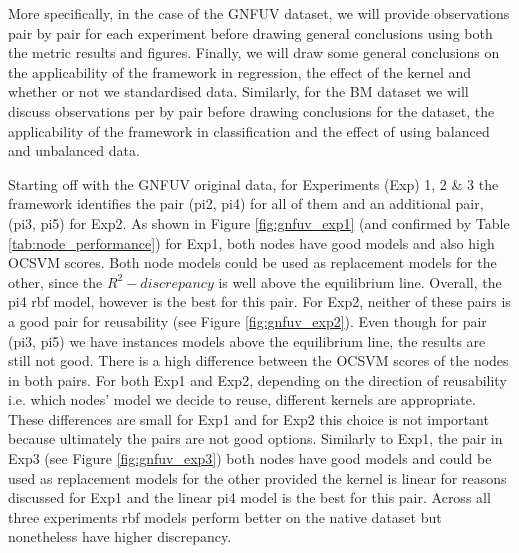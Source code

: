 \documentclass{mpaper}
\begin{document}
More specifically, in the case of the GNFUV dataset, we will provide observations pair by pair for each experiment before drawing general conclusions using both the metric results and figures. Finally, we will draw some general conclusions on the applicability of the framework in regression, the effect of the kernel and whether or not we standardised data. Similarly, for the BM dataset we will discuss observations per by pair before drawing conclusions for the dataset, the applicability of the framework in classification and the effect of using balanced and unbalanced data.

Starting off with the GNFUV original data, for Experiments (Exp) 1, 2 \& 3 the framework identifies the pair (pi2, pi4) for all of them and an additional pair, (pi3, pi5) for Exp2. As shown in Figure \ref{fig:gnfuv_exp1} (and confirmed by Table \ref{tab:node_performance}) for Exp1, both nodes have good models and also high OCSVM scores. Both node models could be used as replacement models for the other, since the $R^2 - discrepancy$ is well above the equilibrium line. Overall, the pi4 rbf model, however is the best for this pair. For Exp2, neither of these pairs is a good pair for reusability (see Figure \ref{fig:gnfuv_exp2}). Even though for pair (pi3, pi5) we have instances models above the equilibrium line, the results are still not good.  There is a high difference between the OCSVM scores of the nodes in both pairs. For both Exp1 and Exp2, depending on the direction of reusability i.e. which nodes' model we decide to reuse, different kernels are appropriate. These differences are small for Exp1 and for Exp2 this choice is not important because ultimately the pairs are not good options. Similarly to Exp1, the pair in Exp3 (see Figure \ref{fig:gnfuv_exp3}) both nodes have good models and could be used as replacement models for the other provided the kernel is linear for reasons discussed for Exp1 and the linear pi4 model is the best for this pair. Across all three experiments rbf models perform better on the native dataset but nonetheless have higher discrepancy.
\end{document}
